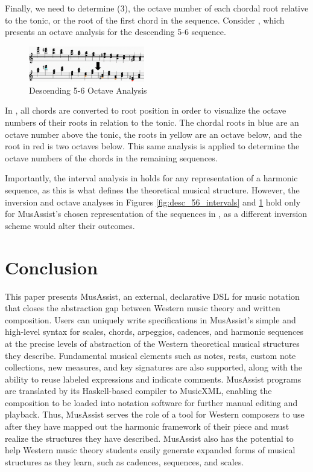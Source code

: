 \documentclass{article}
\begin{document}
Finally, we need to determine (3), the octave number of each chordal root relative to the tonic, or the root of the first chord in the sequence. Consider , which presents an octave analysis for the descending 5-6 sequence.

\begin{figure}[!htbp]
\centering
\includegraphics[width=0.45\textwidth]{images/desc56-example}
  \caption{Descending 5-6 Octave Analysis}
  \label{fig:desc56-example}
  \vspace{-3mm}
\end{figure}

In , all chords are converted to root position in order to visualize the octave numbers of their roots in relation to the tonic. The chordal roots in blue are an octave number above the tonic, the roots in yellow are an octave below, and the root in red is two octaves below. This same analysis is applied to determine the octave numbers of the chords in the remaining sequences.

Importantly, the interval analysis in  holds for any representation of a harmonic sequence, as this is what defines the theoretical musical structure. However, the inversion and octave analyses in Figures \ref{fig:desc_56_intervals} and \ref{fig:desc56-example} hold only for MusAssist’s chosen representation of the sequences in , as a different inversion scheme would alter their outcomes.

\section{Conclusion}
This paper presents MusAssist, an external, declarative DSL for music notation that closes the abstraction gap between Western music theory and written composition. Users can uniquely write specifications in MusAssist’s simple and high-level syntax for scales, chords, arpeggios, cadences, and harmonic sequences at the precise levels of abstraction of the Western theoretical musical structures they describe. Fundamental musical elements such as notes, rests, custom note collections, new measures, and key signatures are also supported, along with the ability to reuse labeled expressions and indicate comments. MusAssist programs are translated by its Haskell-based compiler to MusicXML, enabling the composition to be loaded into notation software for further manual editing and playback. Thus, MusAssist serves the role of a tool for Western composers to use after they have mapped out the harmonic framework of their piece and must realize the structures they have described. MusAssist also has the potential to help Western music theory students easily generate expanded forms of musical structures as they learn, such as cadences, sequences, and scales.
\end{document}
